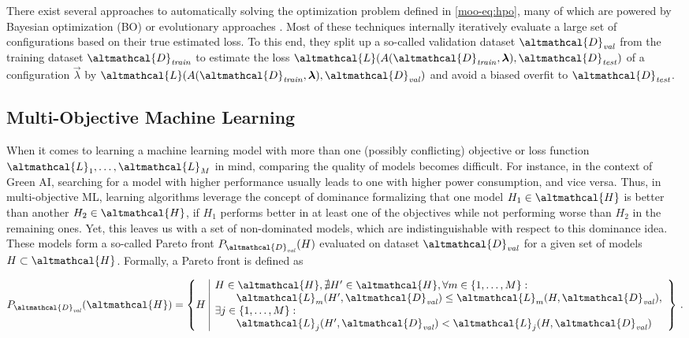 There exist several approaches to automatically solving the optimization problem defined in \eqref{moo-eq:hpo}, many of which are powered by Bayesian optimization (BO) \cite{frazier-arxiv18a} or evolutionary approaches \cite{bischl-dmkd23a}. 
Most of these techniques internally iteratively evaluate a large set of configurations based on their true estimated loss. 
To this end, they split up a so-called validation dataset $\altmathcal{D}_\mathit{val}$ from the training dataset $\altmathcal{D}_\mathit{train}$ to estimate the loss $\altmathcal{L}(A(\altmathcal{D}_{\mathit{train}}, \vec{\lambda}), \altmathcal{D}_\mathit{test})$ of a configuration $\vec{\lambda}$ by $\altmathcal{L}(A(\altmathcal{D}_{\mathit{train}}, \vec{\lambda}), \altmathcal{D}_\mathit{val})$ and avoid a biased overfit to $\altmathcal{D}_\mathit{test}$.

\subsection{Multi-Objective Machine Learning}
\label{moo-ssec:moo}

When it comes to learning a machine learning model with more than one (possibly conflicting) objective or loss function $\altmathcal{L}_1, \dots, \altmathcal{L}_M$ in mind, comparing the quality of models becomes difficult. For instance, in the context of Green AI, searching for a model with higher performance usually leads to one with higher power consumption, and vice versa. Thus, in multi-objective ML, learning algorithms leverage the concept of dominance formalizing that one model $H_1 \in \altmathcal{H}$ is better than another $H_2 \in \altmathcal{H}$, if $H_1$ performs better in at least one of the objectives while not performing worse than $H_2$ in the remaining ones. Yet, this leaves us with a set of non-dominated models, which are indistinguishable with respect to this dominance idea. These models form a so-called Pareto front $P_{\altmathcal{D}_{\mathit{val}}}(H)$ evaluated on dataset $\altmathcal{D}_{\mathit{val}}$ for a given set of models $H \subset \altmathcal{H}$. Formally, a Pareto front is defined as

\begin{equation}
    \label{moo-eq:pareto_def}
        P_{\altmathcal{D}_{\mathit{val}}}(\altmathcal{H}) = \left\{ H \,\, \begin{array}{|l}
        H \in \altmathcal{H}, \nexists H' \in \altmathcal{H},
        \forall m \in \{1, \dots, M\} : \\
        \quad\quad\altmathcal{L}_m(H',\altmathcal{D}_{\mathit{val}}) \leq \altmathcal{L}_m(H,\altmathcal{D}_{\mathit{val}}), \\
        \exists j \in \{1, \dots, M\} : \\
        \quad\quad\altmathcal{L}_j(H',\altmathcal{D}_{\mathit{val}}) < \altmathcal{L}_j(H, \altmathcal{D}_{\mathit{val}})
        \end{array}\right\} \, .
    \end{equation}

